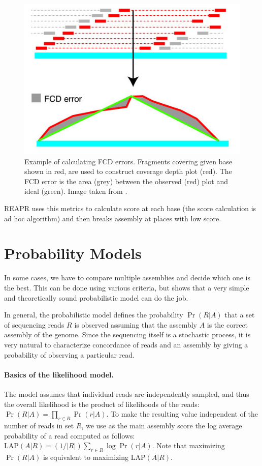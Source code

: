 \begin{figure}
\centering
\includegraphics{../figures/fcd.jpg}
\caption{Example of calculating FCD errors. Fragments covering given base
shown in red, are used to construct coverage depth plot (red). The FCD error is the
area (grey) between the observed (red) plot and ideal (green). Image taken
from \citet{Reapr}.}
\label{fig:fcd}
\end{figure}

REAPR uses this metrics to calculate score at each base 
(the score calculation is ad hoc algorithm) and then breaks assembly
at places with low score.

\section{Probability Models}
\label{sec:prob}
In some cases, we have to compare multiple assemblies and decide which one is
the best. This can be done using various criteria, but \cite{Ghodsi2013} shows
that a very simple and theoretically sound probabilistic model can do the job.

In general, the probabilistic model defines the probability $\Pr(R|A)$ that a set of
sequencing reads $R$ is observed assuming that the assembly $A$ is the
correct assembly of the genome. Since the sequencing itself is a
stochastic process, it is very natural to characterize concordance of
reads and an assembly by giving a probability of observing a particular
read.

\def\LAP{\mathrm{LAP}}

\paragraph{Basics of the likelihood model.}
The model assumes
that individual reads are independently sampled, and thus the overall
likelihood is the product of likelihoods of the reads:
$\Pr(R|A) = \prod_{r\in R} \Pr(r|A).$
To make
the resulting value independent of the number of reads in set 
$R$, we use as the main
assembly score the log average probability of a read computed as
follows: $\LAP(A|R) = (1/|R|)\sum_{r\in R} \log \Pr(r|A).$ Note that
maximizing $\Pr(R|A)$ is equivalent to maximizing $\LAP(A|R)$.

